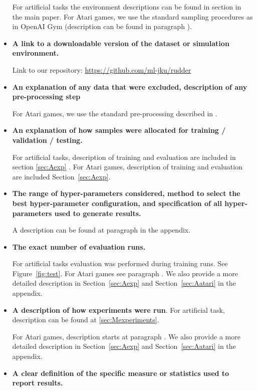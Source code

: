 \documentclass{article}
\begin{document}
\begin{appendices}
\begin{itemize}
    For artificial tasks the environment descriptions can be found in section  in the main paper. For Atari games, we use the standard sampling procedures as in OpenAI Gym \cite{Brockman:16} (description can be found in paragraph ).
\item \textbf{A link to a downloadable version of the dataset or simulation environment.}
    
    Link to our repository:
    \href{https://github.com/ml-jku/baselines-rudder}{https://github.com/ml-jku/rudder}
    
    \item \textbf{An explanation of any data that were excluded, description of any pre-processing step}
    
    For Atari games, we use the standard pre-processing described in \cite{Mnih:16}.
    \item \textbf{An explanation of how samples were allocated for training / validation / testing.}
    
    For artificial tasks, description of training and evaluation are included in section \ref{sec:Aexp} . For Atari games, description of training and evaluation are included Section~\ref{sec:Aexp}.
    \item \textbf{The range of hyper-parameters considered, method to select the best hyper-parameter configuration, and specification of all hyper-parameters used to generate results.}
    
    A description can be found at paragraph  in the appendix. 
    \item \textbf{The exact number of evaluation runs.}
    
    For artificial tasks evaluation was performed during training runs. See Figure~\ref{fig:test}.
    For Atari games see paragraph .
    We also provide a more detailed description in Section~\ref{sec:Aexp} and Section~\ref{sec:Aatari} in the appendix.
    \item \textbf{A description of how experiments were run}.
    For artificial task, description can be found at \ref{sec:Mexperiments}.
    
    For Atari games, description starts at paragraph .
    We also provide a more detailed description in Section~\ref{sec:Aexp} and Section~\ref{sec:Aatari} in the appendix.
    \item \textbf{A clear definition of the specific measure or statistics used to report results.}
    

\end{itemize}
\end{appendices}
\end{document}
